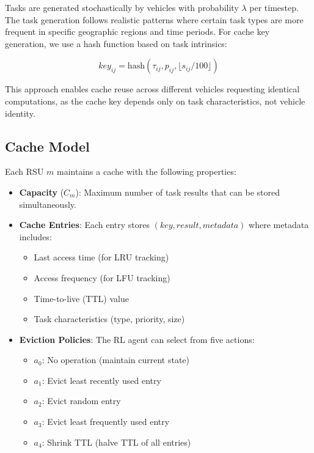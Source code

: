 Tasks are generated stochastically by vehicles with probability $\lambda$ per timestep. The task generation follows realistic patterns where certain task types are more frequent in specific geographic regions and time periods. For cache key generation, we use a hash function based on task intrinsics:

\begin{equation}
    key_{ij} = \text{hash}(\tau_{ij}, p_{ij}, \lfloor s_{ij}/100 \rfloor)
\end{equation}

This approach enables cache reuse across different vehicles requesting identical computations, as the cache key depends only on task characteristics, not vehicle identity.

\subsection{Cache Model}

Each RSU $m$ maintains a cache with the following properties:

\begin{itemize}
    \item \textbf{Capacity} ($C_m$): Maximum number of task results that can be stored simultaneously.
    
    \item \textbf{Cache Entries}: Each entry stores $(key, result, metadata)$ where metadata includes:
    \begin{itemize}
        \item Last access time (for LRU tracking)
        \item Access frequency (for LFU tracking)
        \item Time-to-live (TTL) value
        \item Task characteristics (type, priority, size)
    \end{itemize}
    
    \item \textbf{Eviction Policies}: The RL agent can select from five actions:
    \begin{itemize}
        \item $a_0$: No operation (maintain current state)
        \item $a_1$: Evict least recently used entry
        \item $a_2$: Evict random entry
        \item $a_3$: Evict least frequently used entry
        \item $a_4$: Shrink TTL (halve TTL of all entries)
    \end{itemize}
\end{itemize}

